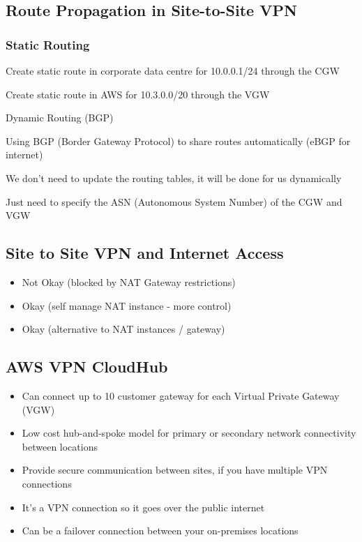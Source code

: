 \subsection{Route Propagation in Site-to-Site VPN}

\subsubsection{Static Routing}
\item Create static route in corporate data centre for 10.0.0.1/24 through the CGW
\item Create static route in AWS for 10.3.0.0/20 through the VGW
\item Dynamic Routing (BGP)
\item Using BGP (Border Gateway Protocol) to share routes automatically (eBGP for internet)
\item We don't need to update the routing tables, it will be done for us dynamically
\item Just need to specify the ASN (Autonomous System Number) of the CGW and VGW

\subsection{Site to Site VPN and Internet Access}
\begin{itemize}
    \item Not Okay (blocked by NAT Gateway restrictions)
    \item Okay (self manage NAT instance - more control)
    \item Okay (alternative to NAT instances / gateway)
\end{itemize}

\subsection{AWS VPN CloudHub}
\begin{itemize}
    \item Can connect up to 10 customer gateway for each Virtual Private Gateway (VGW)
    \item Low cost hub-and-spoke model for primary or secondary network connectivity between locations
    \item Provide secure communication between sites, if you have multiple VPN connections
    \item It's a VPN connection so it goes over the public internet
    \item Can be a failover connection between your on-premises locations
\end{itemize}

